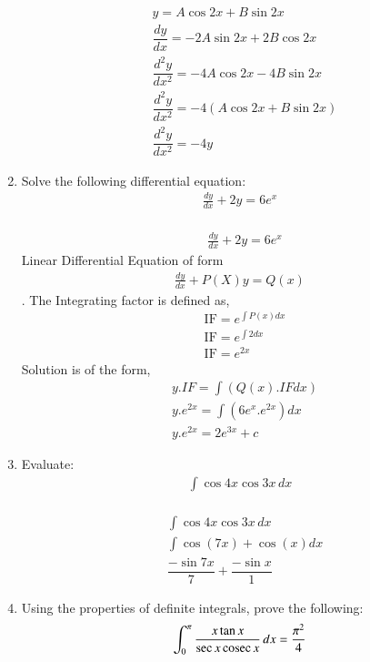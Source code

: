 \documentclass[journal,12pt,twocolumn]{IEEEtran}
\renewcommand\thesection{\arabic{section}}
\begin{document}
\begin{enumerate}[label=\thesection.\arabic*.,ref=\thesection.\theenumi]
\solution\\
\begin{align}
& y = A\cos 2x + B\sin 2x \\
& \dfrac{dy}{dx} = -2A\sin 2x + 2B\cos 2x \\
& \dfrac{d^2y}{dx^2} = -4A\cos 2x -4B\sin 2x \\
& \dfrac{d^2y}{dx^2} = -4(A\cos 2x + B\sin 2x) \\
& \dfrac{d^2y}{dx^2} = -4y
\end{align}
\item Solve the following differential equation:
\begin{align}
   \displaystyle\frac{dy}{dx} + 2y = 6e^x \nonumber
\end{align}
\solution \\
\begin{align}
&\displaystyle\frac{dy}{dx} + 2y = 6e^x
\end{align}
Linear Differential Equation of form \begin{align} \displaystyle\frac{dy}{dx} + P(X)y = Q(x) \end{align}. The Integrating factor is defined as,
\begin{align}
& \text{IF} = e^{\int {P(x)}dx}\\
& \text{IF} =  e^{\int {2}dx}\\
& \text{IF} = e^{2x}
\end{align}
Solution is of the form,\\
\begin{align}
&y.IF = \int (Q(x).IF dx)\\
&y.e^{2x} = \int (6e^x.e^{2x}) dx \\
&y.e^{2x} = 2e^{3x}+c
\end{align}
\item Evaluate:
\begin{align}
   \int \cos 4x\cos 3x\, dx 
\end{align}
\solution \\
\begin{align}
&\int \cos 4x\cos 3x\, dx\\
&\int \cos(7x)+\cos(x)dx\\
&\dfrac{-\sin 7x}{7} + \dfrac{-\sin x}{1}
\end{align}
\item Using the properties of definite integrals, prove the following:
\begin{align}
 \int_{0}^{\pi} \displaystyle\frac{x\tan x}{\sec x\,\text{cosec}\, x}\, dx = \displaystyle\frac{\pi^2}{4} \nonumber
\end{align}

\end{enumerate}
\end{document}
